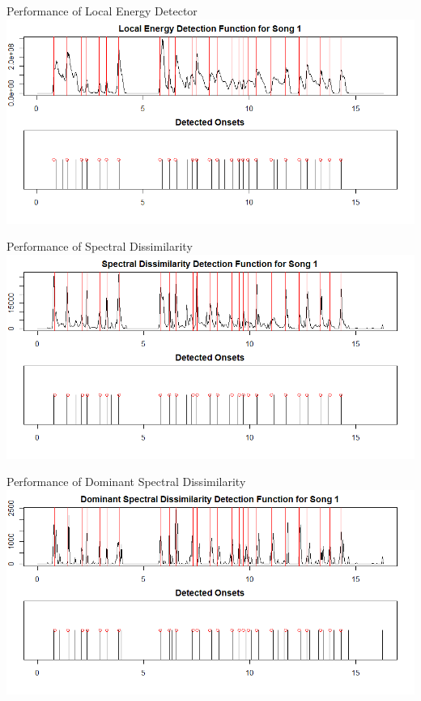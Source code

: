 \documentclass[10pt]{beamer}
\begin{document}
\begin{frame}{Performance of Local Energy Detector}
    \includegraphics[width = \textwidth]{fig/energy_song1.png}
\end{frame}

\begin{frame}{Performance of Spectral Dissimilarity}
    \includegraphics[width = \textwidth]{fig/spectral_song1.png}
\end{frame}

\begin{frame}{Performance of Dominant Spectral Dissimilarity}
    \includegraphics[width = \textwidth]{fig/dfreq_song1.png}
\end{frame}
\end{document}
